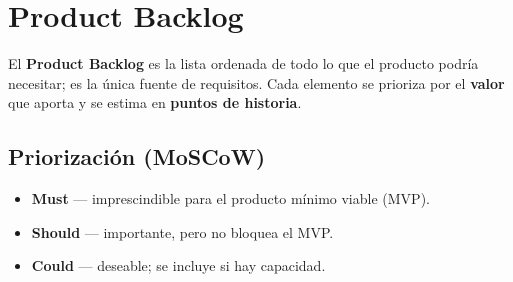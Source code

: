 \documentclass[11pt,a4paper]{article}
\begin{document}
\section{Product Backlog}
El \textbf{Product Backlog} es la lista ordenada de todo lo que el producto podría
necesitar; es la única fuente de requisitos. Cada elemento se prioriza por el
\textbf{valor} que aporta y se estima en \textbf{puntos de historia}.

\subsection{Priorización (MoSCoW)}
\begin{itemize}
  \item \textbf{Must} — imprescindible para el producto mínimo viable (MVP).
  \item \textbf{Should} — importante, pero no bloquea el MVP.
  \item \textbf{Could} — deseable; se incluye si hay capacidad.
\end{itemize}
\end{document}
